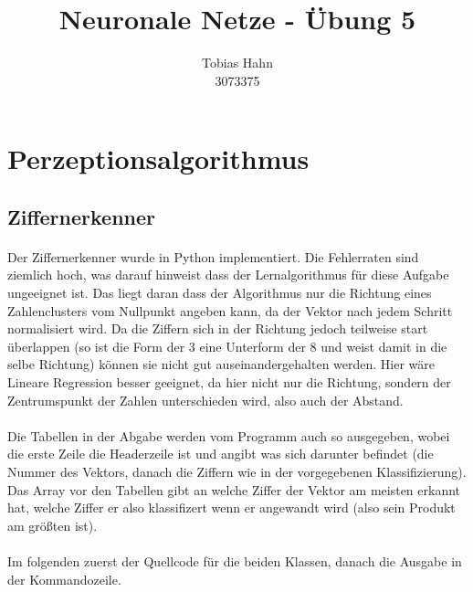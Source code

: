 \documentclass{article}
\title{Neuronale Netze - Übung 5}
\author{Tobias Hahn\\ 3073375}
\begin{document}
\maketitle
\newpage
\section{Perzeptionsalgorithmus}
\subsection{Ziffernerkenner}
\paragraph{}
Der Ziffernerkenner wurde in Python implementiert. Die Fehlerraten sind ziemlich hoch, was darauf hinweist dass der Lernalgorithmus für diese Aufgabe ungeeignet ist. Das liegt daran dass der Algorithmus nur die Richtung eines Zahlenclusters vom Nullpunkt angeben kann, da der Vektor nach jedem Schritt normalisiert wird. Da die Ziffern sich in der Richtung jedoch teilweise start überlappen (so ist die Form der 3 eine Unterform der 8 und weist damit in die selbe Richtung) können sie nicht gut auseinandergehalten werden. Hier wäre Lineare Regression besser geeignet, da hier nicht nur die Richtung, sondern der Zentrumspunkt der Zahlen unterschieden wird, also auch der Abstand.

\paragraph{}
Die Tabellen in der Abgabe werden vom Programm auch so ausgegeben, wobei die erste Zeile die Headerzeile ist und angibt was sich darunter befindet (die Nummer des Vektors, danach die Ziffern wie in der vorgegebenen Klassifizierung). Das Array vor den Tabellen gibt an welche Ziffer der Vektor am meisten erkannt hat, welche Ziffer er also klassifizert wenn er angewandt wird (also sein Produkt am größten ist).

\paragraph{}
Im folgenden zuerst der Quellcode für die beiden Klassen, danach die Ausgabe in der Kommandozeile.
\end{document}
